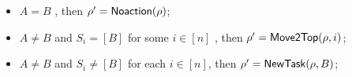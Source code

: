 {\noindent  {}
	\begin{itemize}
		\item $A=B$ , then $\rho' = {\sf Noaction}(\rho )$;
		\item  $A \neq B$ and $S_i = [B]$ for some $i\in [n]$ , then $\rho' = {\sf Move2Top}(\rho, i)$;
		\item  $A \neq B$ and $S_i \neq [B]$ for each $i \in [n]$, then $\rho'= {\sf NewTask}(\rho,B )$;
	\end{itemize}

	
	
}
